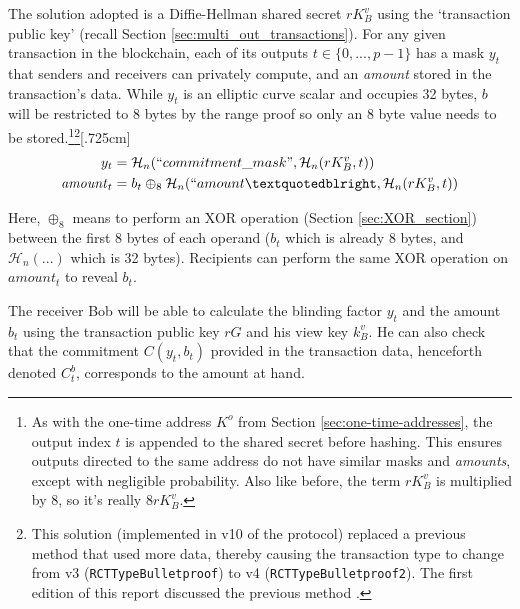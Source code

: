 The solution adopted is a Diffie-Hellman shared secret $r K_B^v$ using the `transaction public key' (recall Section \ref{sec:multi_out_transactions}). For any given transaction in the blockchain, each of its outputs $t \in \{0, ..., p-1\}$ has a mask $y_t$ that senders and receivers can privately compute, and an {\em amount} stored in the transaction's data. While $y_t$ is an elliptic curve scalar and occupies 32 bytes, $b$ will be restricted to 8 bytes by the range proof so only an 8 byte value needs to be stored.\footnote{As with the one-time address $K^o$ from Section \ref{sec:one-time-addresses}, the output index $t$ is appended to the shared secret before hashing. This ensures outputs directed to the same address do not have similar masks and {\em amounts}, except with negligible probability. Also like before, the term $r K^v_B$ is multiplied by 8, so it's really $8rK^v_B.$}\footnote{This solution (implemented in v10 of the protocol) replaced a previous method that used more data, thereby causing the transaction type to change from v3 ({\tt RCTTypeBulletproof}) to v4 ({\tt RCTTypeBulletproof2}). The first edition of this report discussed the previous method \cite{ztm-1}.}[.725cm]\vspace{.175cm}%
\begin{align*}
  y_t &= \mathcal{H}_n(``commitment\_mask",\mathcal{H}_n(r K_B^v, t)) \\
  \mathit{amount}_t &= b_t \oplus_8 \mathcal{H}_n(``amount”, \mathcal{H}_n(r K_B^v, t))
\end{align*}

Here, $\oplus_8$ means to perform an XOR operation (Section \ref{sec:XOR_section}) between the first 8 bytes of each operand ($b_t$ which is already 8 bytes, and $\mathcal{H}_n(...)$ which is 32 bytes). Recipients can perform the same XOR operation on $\mathit{amount}_t$ to reveal $b_t$.

The receiver Bob will be able to calculate the blinding factor $y_t$ and the amount $b_t$ using the transaction public key $r G$ and his view key $k_B^v$. He can also check that the commitment $C(y_t, b_t)$ provided in the transaction data, henceforth denoted $C_t^b$, corresponds to the amount at hand.\\

